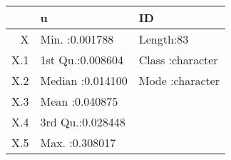 \begin{table}[ht]
\centering
\begin{tabular}{rll}
  \hline
 &       u &      ID \\ 
  \hline
X & Min.   :0.001788   & Length:83          \\ 
  X.1 & 1st Qu.:0.008604   & Class :character   \\ 
  X.2 & Median :0.014100   & Mode  :character   \\ 
  X.3 & Mean   :0.040875   &  \\ 
  X.4 & 3rd Qu.:0.028448   &  \\ 
  X.5 & Max.   :0.308017   &  \\ 
   \hline
\end{tabular}
\end{table}
